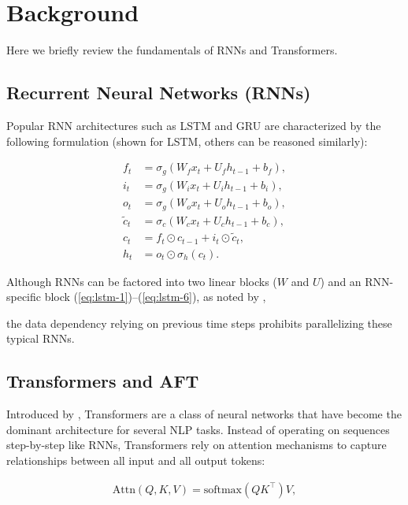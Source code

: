 \section{Background} \label{background}

Here we briefly review the fundamentals of RNNs and Transformers. 

\subsection{Recurrent Neural Networks (RNNs)}

Popular RNN architectures such as LSTM \cite{RNN_LSTM97} and GRU \cite{RNN_GRU2014} are characterized by the following formulation (shown for LSTM, others can be reasoned similarly):

\begin{align}
f_t &= \sigma_g(W_{f} x_t + U_{f} h_{t-1} + b_f), \label{eq:lstm-1}\\
i_t &= \sigma_g(W_{i} x_t + U_{i} h_{t-1} + b_i), \\
o_t &= \sigma_g(W_{o} x_t + U_{o} h_{t-1} + b_o), \\
\tilde{c}_t &= \sigma_c(W_{c} x_t + U_{c} h_{t-1} + b_c), \\
c_t &= f_t \odot c_{t-1} + i_t \odot \tilde{c}_t,\\
h_t &= o_t \odot \sigma_h(c_t). \label{eq:lstm-6}
\end{align}

Although RNNs can be factored into two linear blocks ($W$ and $U$) and an RNN-specific block (\ref{eq:lstm-1})--(\ref{eq:lstm-6}), as noted by \citet{RNN_QuasiRNN17},

the data dependency relying on previous time steps prohibits parallelizing these typical RNNs.

\subsection{Transformers and AFT} \label{sec:background-attn} 
Introduced by \citet{vaswani2017attention}, Transformers are a class of neural networks that have become the dominant architecture for several NLP tasks. Instead of operating on sequences step-by-step like RNNs, Transformers rely on attention mechanisms to capture relationships between all input and all output tokens:

\begin{align}
\mathrm{Attn}(Q, K, V) = \mathrm{softmax}(QK^\top)V,
\end{align}

